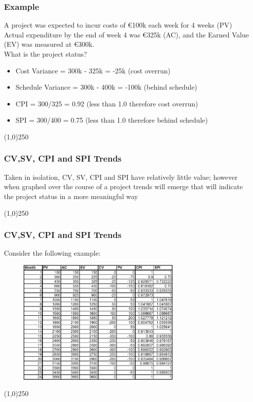 \begin{frame}
\frametitle{Example}
A project was expected to incur costs of \euro100k each week for 4 weeks (PV)\\
Actual expenditure by the end of week 4 was \euro325k (AC), and the Earned Value (EV) was measured at \euro300k.\\
What is the project status?\\
\begin{itemize}
	\item Cost Variance = 300k - 325k = -25k  		(cost overrun)
	\item Schedule Variance = 300k - 400k = -100k 	(behind schedule)
	\item CPI = 300/325 = 0.92 (less than 1.0 therefore cost overrun)
	\item SPI = 300/400 = 0.75 (less than 1.0 therefore behind schedule)
\end{itemize}
\end{frame}
\begin{center}\line(1,0){250}\end{center}






\begin{frame}
\frametitle{CV,SV, CPI and SPI Trends}
Taken in isolation, CV, SV, CPI and SPI have relatively little value; however when graphed over the course of a project trends will emerge that will indicate the project status in a more meaningful way
\end{frame}
\begin{center}\line(1,0){250}\end{center}







\begin{frame}
\frametitle{CV,SV, CPI and SPI Trends}
Consider the following example:
\begin{figure}
	\centering
		\includegraphics[width = 8cm]{images/trends.jpg}
	\label{fig:trends}
\end{figure}
\end{frame}
\begin{center}\line(1,0){250}\end{center}






